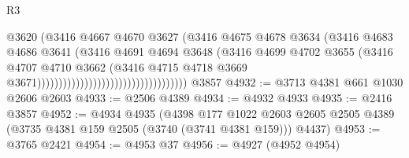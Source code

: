 \begin{lexlean}{R3}
\begin{coremodule}
                                                            @3620
                                                            (@3416
                                                              @4667
                                                              @4670
                                                              @3627
                                                              (@3416
                                                                @4675
                                                                @4678
                                                                @3634
                                                                (@3416
                                                                  @4683
                                                                  @4686
                                                                  @3641
                                                                  (@3416
                                                                    @4691
                                                                    @4694
                                                                    @3648
                                                                    (@3416
                                                                      @4699
                                                                      @4702
                                                                      @3655
                                                                      (@3416
                                                                        @4707
                                                                        @4710
                                                                        @3662
                                                                        (@3416
                                                                          @4715
                                                                          @4718
                                                                          @3669
                                                                          @3671)))))))))))))))))))))))))))))))))))
    @3857
@4932 := @3713 @4381 @661 @1030 @2606 @2603
@4933 := @2506 @4389
@4934 := @4932 @4933
@4935 := @2416 @3857
@4952 := @4934
    @4935
    (@4398
      @177
      @1022
      @2603
      @2605
      @2505
      @4389
      (@3735 @4381 @159 @2505 (@3740 (@3741 @4381 @159)))
      @4437)
@4953 := @3765 @2421
@4954 := @4953 @37
@4956 := @4927 (@4952 @4954)

\end{coremodule}
\end{lexlean}
